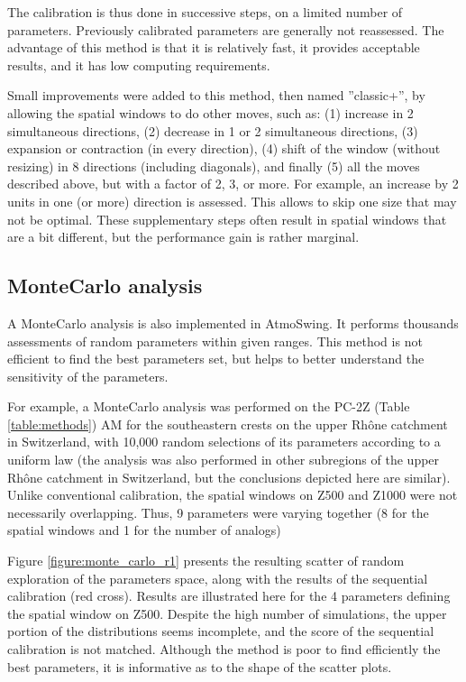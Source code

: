 \documentclass[review]{elsarticle}
\begin{document}
The calibration is thus done in successive steps, on a limited number of parameters. Previously calibrated parameters are generally not reassessed. The advantage of this method is that it is relatively fast, it provides acceptable results, and it has low computing requirements. 

Small improvements were added to this method, then named ''classic+'', by allowing the spatial windows to do other moves, such as: (1) increase in 2 simultaneous directions, (2) decrease in 1 or 2 simultaneous directions, (3) expansion or contraction (in every direction), (4) shift of the window (without resizing) in 8 directions (including diagonals), and finally (5) all the moves described above, but with a factor of 2, 3, or more. For example, an increase by 2 units in one (or more) direction is assessed. This allows to skip one size that may not be optimal. These supplementary steps often result in spatial windows that are a bit different, but the performance gain is rather marginal.

\subsection{Monte\textendash Carlo analysis}

A Monte\textendash Carlo analysis is also implemented in AtmoSwing. It performs thousands assessments of random parameters within given ranges. This method is not efficient to find the best parameters set, but helps to better understand the sensitivity of the parameters.

For example, a Monte\textendash Carlo analysis was performed on the PC-2Z (Table \ref{table:methods}) AM for the southeastern crests on the upper Rh\^{o}ne catchment in Switzerland, with 10,000 random selections of its parameters according to a uniform law (the analysis was also performed in other subregions of the upper Rh\^{o}ne catchment in Switzerland, but the conclusions depicted here are similar). Unlike conventional calibration, the spatial windows on Z500 and Z1000 were not necessarily overlapping. Thus, 9 parameters were varying together (8 for the spatial windows and 1 for the number of analogs)

Figure \ref{figure:monte_carlo_r1} presents the resulting scatter of random exploration of the parameters space, along with the results of the sequential calibration (red cross). Results are illustrated here for the 4 parameters defining the spatial window on Z500. Despite the high number of simulations, the upper portion of the distributions seems incomplete, and the score of the sequential calibration is not matched. Although the method is poor to find efficiently the best parameters, it is informative as to the shape of the scatter plots.
\end{document}
